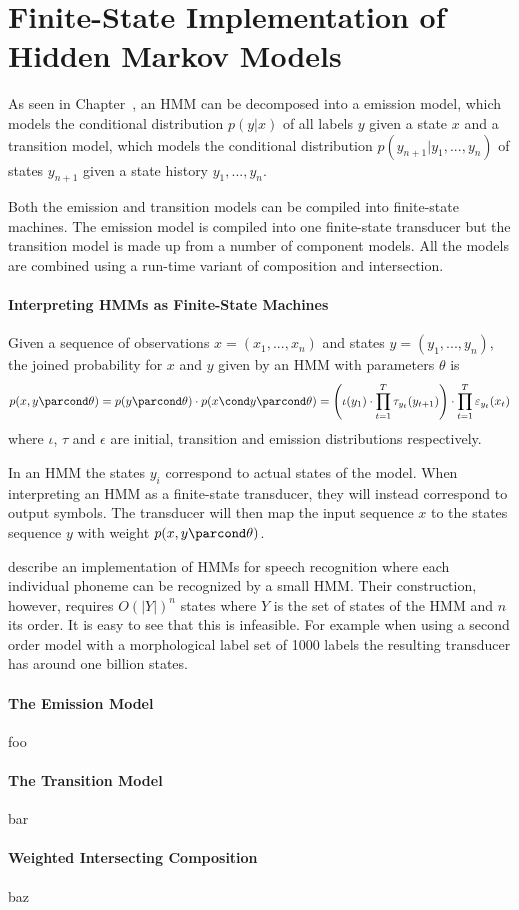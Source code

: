 \section{Finite-State Implementation of Hidden Markov Models}
As seen in Chapter~\cite{chapter:hmm}, an HMM can be decomposed into a
emission model, which models the conditional distribution $p(y|x)$ of
all labels $y$ given a state $x$ and a transition model, which models
the conditional distribution $p(y_{n+1} | y_1, ..., y_n)$ of states
$y_{n+1}$ given a state history $y_1, ..., y_n$.

Both the emission and transition models can be compiled into
finite-state machines. The emission model is compiled into one
finite-state transducer but the transition model is made up from a
number of component models. All the models are combined using a
run-time variant of composition and intersection.

\paragraph{Interpreting HMMs as Finite-State Machines}
Given a sequence of observations $x = (x_1, ..., x_n)$ and states $y = (y_1, ..., y_n)$, the joined probability for $x$ and $y$ given by an HMM with parameters $\theta$ is 
$$p(x,y\parcond\theta) = p(y\parcond\theta)\cdot p(x \cond y\parcond\theta)= \Bigg(\iota(y_1) \cdot \prod_{t = 1}^{T} \tau_{y_t}(y_{t + 1})\Bigg) \cdot \prod_{t = 1}^T \varepsilon_{y_t}(x_t)$$
where $\iota$, $\tau$ and $\epsilon$ are initial, transition and emission distributions respectively.

In an HMM the states $y_i$ correspond to actual states of the
model. When interpreting an HMM as a finite-state transducer, they
will instead correspond to output symbols. The transducer will then
map the input sequence $x$ to the states sequence $y$ with weight
$p(x,y\parcond\theta)$.

\cite{Mohri2002} describe an implementation of HMMs for speech
recognition where each individual phoneme can be recognized by a small
HMM. Their construction, however, requires $O(|Y|)^n$ states where $Y$
is the set of states of the HMM and $n$ its order. It is easy to see
that this is infeasible. For example when using a second order model
with a morphological label set of 1000 labels the resulting transducer
has around one billion states.

\paragraph{The Emission Model}
foo

\paragraph{The Transition Model}
bar

\paragraph{Weighted Intersecting Composition}
baz